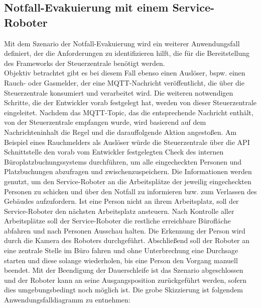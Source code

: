 \subsection{Notfall-Evakuierung mit einem Service-Roboter}
\label{subsec:evacuation}
    Mit dem Szenario der Notfall-Evakuierung wird ein weiterer Anwendungsfall definiert, der die 
    Anforderungen zu identifizieren hilft, die für die Bereitstellung des Frameworks der Steuerzentrale benötigt werden. 
    \\
    \linebreak
    Objektiv betrachtet gibt es bei diesem Fall ebenso einen Auslöser, bspw. einen Rauch- 
    oder Gasmelder, der eine \acs{MQTT}-Nachricht veröffentlicht, die über die Steuerzentrale konsumiert und verarbeitet wird. Die 
    weiteren notwendigen Schritte, die der Entwickler vorab festgelegt hat, werden von dieser Steuerzentrale eingeleitet. 
    Nachdem das \acs{MQTT}-Topic, das die entsprechende Nachricht enthält, von der Steuerzentrale empfangen wurde, wird 
    basierend auf dem Nachrichteninhalt die Regel und die darauffolgende Aktion angestoßen. Am Beispiel eines Rauchmelders 
    als Auslöser würde die Steuerzentrale über die \acs{API} 
    Schnittstelle den vorab vom Entwickler festgelegten Check des internen Büroplatzbuchungssystems durchführen, um alle 
    eingecheckten Personen und Platzbuchungen abzufragen und 
    zwischenzuspeichern. Die Informationen werden genutzt, um den Service-Roboter an die Arbeitsplätze der jeweilig 
    eingecheckten Personen zu schicken und über den Notfall zu informieren bzw. zum Verlassen des Gebäudes aufzufordern. 
    Ist eine Person nicht an ihrem Arbeitsplatz, soll der Service-Roboter den nächsten Arbeitsplatz ansteuern. Nach Kontrolle aller 
    Arbeitsplätze soll der Service-Roboter die restliche erreichbare Bürofläche abfahren und nach Personen 
    Ausschau halten. Die Erkennung der Person wird durch die Kamera des Roboters durchgeführt. Abschließend soll der Roboter 
    an eine zentrale Stelle im Büro fahren und ohne Unterbrechung eine 
    Durchsage starten und diese solange wiederholen, bis eine Person den Vorgang manuell beendet. Mit der Beendigung der Dauerschleife 
    ist das Szenario abgeschlossen und der Roboter kann an seine Ausgangsposition zurückgeführt werden, sofern dies 
    umgebungsbedingt noch möglich ist. Die grobe Skizzierung ist folgendem Anwendungsfalldiagramm zu entnehmen: 
